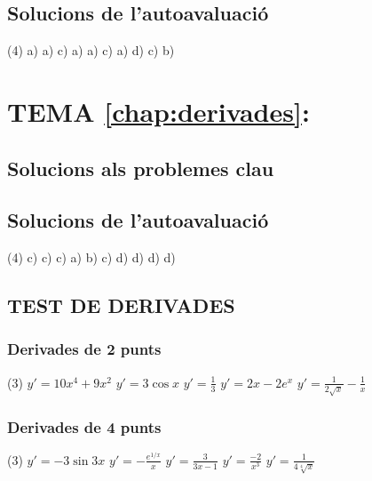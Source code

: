 \subsection*{Solucions de l'autoavaluació}
\begin{tasks}[style=enumerate,label-width=4ex](4)
	\task a)
	\task a)
	\task c)
	\task a)
	\task a)
	\task c)
	\task a)
	\task d)
	\task c)
	\task b)
\end{tasks}



\section*{TEMA \ref{chap:derivades}: }
\subsection*{Solucions als problemes clau \simbolclau}


\subsection*{Solucions de l'autoavaluació}
\begin{tasks}[style=enumerate,label-width=4ex](4)
	\task c)
	\task c)
	\task c)
	\task a)
	\task b)
	\task c)
	\task d)
	\task d)
	\task d)
	\task d)
\end{tasks}

\subsection*{TEST DE DERIVADES}
\subsubsection*{Derivades de 2 punts}
\begin{tasks}(3)
	\task $y'=10x^4+9x^2$
	\task $y'=3\cos x$
	\task $y'=\frac{1}{3}$
	\task $y'=2x-2e^x$
	\task $y'=\frac{1}{2\sqrt{x}} - \frac{1}{x}$
\end{tasks}
\subsubsection*{Derivades de 4 punts}
\begin{tasks}(3)
	\task  $y'= - 3 \sin 3x$
	\task $y'= -\frac{ e^{1/x}}{x}$
	\task $y'= \frac{3}{3x-1}$
	\task $y'= \frac{-2}{x^3}$
	\task $y'=\frac{1}{4\sqrt[4]{x}}$
\end{tasks}
